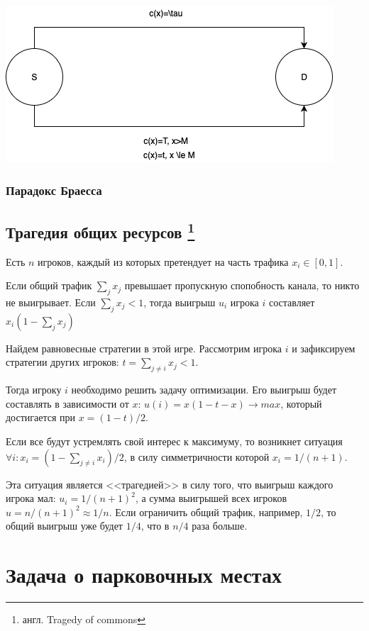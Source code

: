 \includegraphics[scale=.7]{img/pigou}


\subsection{Парадокс Браесса}\cite[65]{gas}

\section{Трагедия общих ресурсов \footnote{англ. Tragedy of commons}}

Есть $n$ игроков, каждый из которых претендует на часть трафика $x_i\in[0,1]$.

Если общий трафик $\sum_j x_j$ превышает пропускную спопобность канала, то никто не выигрывает.
Если
$\sum_j x_j < 1$,
тогда выигрыш $u_i$ игрока 
$i$ составляет $x_i(1-\sum_j x_j)$

Найдем равновесные стратегии в этой игре.
Рассмотрим игрока $i$ и зафиксируем стратегии других игроков: $t=\sum_{j\ne i} x_j<1$.

Тогда игроку $i$ необходимо решить задачу оптимизации. 
Его выигрыш будет составлять в зависимости от $x$:
$u(i)=x(1-t-x)\to max$, который достигается при $x=(1-t)/2$.

Если все будут устремлять свой интерес к максимуму, то возникнет ситуация $\forall i: x_i=(1-\sum_{j\ne i} x_i)/2$, в силу симметричности которой $x_i=1/(n+1)$.

Эта ситуация является <<трагедией>> в силу того, что выигрыш каждого игрока мал: $u_i=1/(n+1)^2$, а сумма выигрышей всех игроков $u=n/(n+1)^2\approx 1/n$. Если ограничить общий трафик, например, $1/2$, то общий выигрыш уже будет $1/4$, что в $n/4$ раза больше\cite[5]{nisan}.


\chapter{Задача о парковочных местах}







